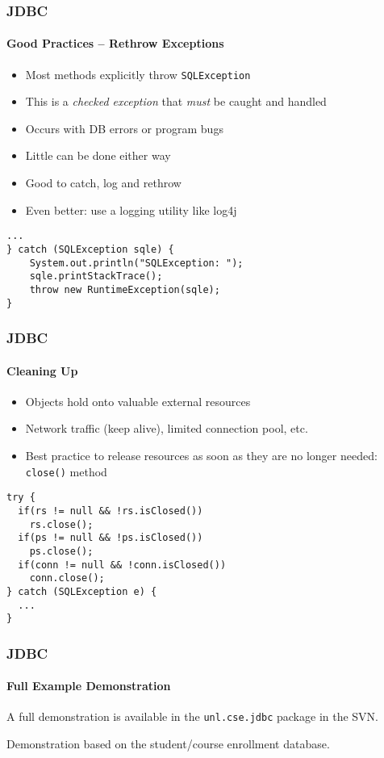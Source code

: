 \documentclass{beamer}
\begin{document}
\begin{frame}[fragile]
  \frametitle{JDBC}
  \framesubtitle{Good Practices -- Rethrow Exceptions}

\begin{itemize}
  \item Most methods explicitly throw \texttt{SQLException} 
  \item This is a \emph{checked exception} that \emph{must} be caught and handled
  \item Occurs with DB errors or program bugs
  \item Little can be done either way
  \item Good to catch, log and rethrow 
  \item Even better: use a logging utility like log4j 
\end{itemize}

\begin{verbatim}
...
} catch (SQLException sqle) {
    System.out.println("SQLException: ");
    sqle.printStackTrace();
    throw new RuntimeException(sqle);
}
\end{verbatim}

\end{frame}

\begin{frame}[fragile]
  \frametitle{JDBC}
  \framesubtitle{Cleaning Up}

\begin{itemize}
  \item Objects hold onto valuable external resources
  \item Network traffic (keep alive), limited connection pool, etc.
  \item Best practice to release resources as soon as they are no longer needed: \texttt{close()} method
\end{itemize}

\begin{verbatim}
try {
  if(rs != null && !rs.isClosed())
    rs.close();
  if(ps != null && !ps.isClosed())
    ps.close();
  if(conn != null && !conn.isClosed())
    conn.close();
} catch (SQLException e) {
  ...
}
\end{verbatim}

\end{frame}

\begin{frame}[fragile]
  \frametitle{JDBC}
  \framesubtitle{Full Example Demonstration}

A full demonstration is available in the \texttt{unl.cse.jdbc} package in the SVN.

Demonstration based on the student/course enrollment database.

\end{frame}
\end{document}
